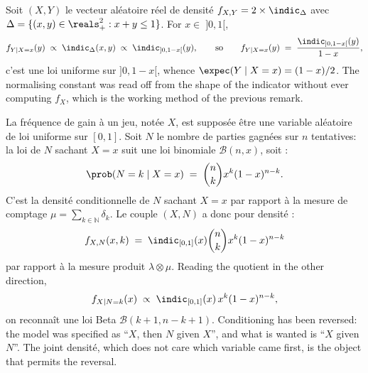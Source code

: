 \begin{example}
  Soit $(X,Y)$ le vecteur aléatoire réel de densité $f_{X,Y} = 2 \times \indic_{\Delta}$
  avec $\Delta = \{(x,y) \in \reals_{+}^{2} : x + y \leq 1\}$. For $x \in \;]0,1[$,
  \[
    f_{Y \mid X = x}(y) \;\propto\; \indic_{\Delta}(x,y) \;\propto\; \indic_{]0,1-x[}(y) ,
    \qquad\text{so}\qquad
    f_{Y \mid X = x}(y) \;=\; \frac{\indic_{]0,1-x[}(y)}{1-x} ,
  \]
  c'est une loi uniforme sur $]0,1-x[$, whence $\expec(Y \mid X = x) = (1-x)/2$. The
  normalising constant was read off from the shape of the indicator without ever
  computing $f_{X}$, which is the working method of the previous remark.
\end{example}

\begin{example}
  La fréquence de gain à un jeu, notée $X$, est supposée être une variable aléatoire
  de loi uniforme sur $[0,1]$. Soit $N$ le nombre de parties gagnées sur $n$
  tentatives: la loi de $N$ sachant $X = x$ suit une loi binomiale
  $\mathcal{B}(n,x)$, soit :
  \[
    \prob(N = k \mid X = x) \;=\; \binom{n}{k} x^{k} (1-x)^{n-k} .
  \]
  C'est la densité conditionnelle de $N$ sachant $X = x$ par rapport à la mesure de
  comptage $\mu = \sum_{k \in \mathbb{N}} \delta_{k}$. Le couple $(X,N)$ a donc pour
  densité :
  \[
    f_{X,N}(x,k) \;=\; \indic_{[0,1]}(x) \binom{n}{k} x^{k} (1-x)^{n-k}
  \]
  par rapport à la mesure produit $\lambda \otimes \mu$. Reading the quotient
  in the other direction,
  \[
    f_{X \mid N = k}(x) \;\propto\; \indic_{[0,1]}(x) \, x^{k} (1-x)^{n-k} ,
  \]
  on reconnaît une loi Beta $\mathcal{B}(k+1, n-k+1)$. Conditioning has
  been reversed: the model was specified as ``$X$, then $N$ given $X$'', and what
  is wanted is ``$X$ given $N$''. The joint densité, which does not care which
  variable came first, is the object that permits the reversal.
\end{example}

